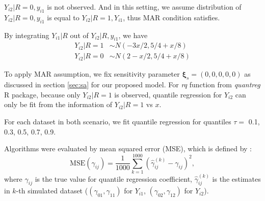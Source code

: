 \documentclass[12pt]{article}
\begin{document}
$Y_{i2}| R = 0, y_{i1}$ is not observed. And in this setting, we
assume distribution of $Y_{i2} | R = 0, y_{i1}$ is equal to $Y_{i2}|
R= 1, Y_{i1}$, thus MAR condition satisfies.

By integrating $Y_{i1}|R$ out of $Y_{i2}|R, y_{i1}$, we have
\begin{align*}
  Y_{i2} | R = 1 & \sim N( - 3x/2, 5/4 + x/8) \\
  Y_{i2} | R = 0 & \sim N( 2 - x/2, 5/4 + x/8)
\end{align*}

To apply MAR assumption, we fix sensitivity parameter $\bm \xi_s =
(0,0,0,0,0)$ as discussed in section \ref{sec:sa} for our proposed
model. For \textit{rq} function from \textit{quantreg} R package,
because only $Y_{i2}| R = 1$ is observed, quantile regression for
$Y_{i2}$ can only be fit from the information of $Y_{i2}|R = 1$ vs
$x$.

For each dataset in both scenario, we fit quantile regression for
quantiles $\tau =$ 0.1, 0.3, 0.5, 0.7, 0.9.

Algorithms were evaluated by mean squared error (MSE), which is
defined by :
\begin{equation*}
  \text{MSE} (\gamma_{ij}) = \frac{1}{1000} \sum_{k = 1}^{1000} 
\left( \hat{\gamma}_{ij}^{(k)}  - \gamma_{ij}\right)^2,
\end{equation*}
where $\gamma_{ij}$ is the true value for quantile regression
coefficient, $\hat{\gamma}_{ij}^{(k)}$ is the estimates in $k$-th
simulated dataset ($(\gamma_{01}, \gamma_{11})$ for $Y_{i1}$,
$(\gamma_{02}, \gamma_{12})$ for $Y_{i2}$).
 
\end{document}
